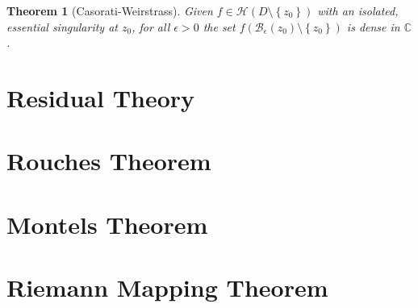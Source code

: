 \documentclass[11pt]{article}
\newcommand{\C}{\mathbb{C}}
\newtheorem{theorem}{Theorem}[section]
\begin{document}
\begin{theorem}[Casorati-Weirstrass]
Given $f\in\mathcal{H}(D\setminus\left\{z_0\right\})$ with an isolated, essential singularity at $z_0$, for all $\epsilon>0$ the set $f(\mathcal{B}_\epsilon(z_0)\setminus\left\{z_0\right\})$ is dense in $\C$.
\end{theorem}

\section{Residual Theory}

\section{Rouches Theorem}

\section{Montels Theorem}

\section{Riemann Mapping Theorem}
\end{document}
